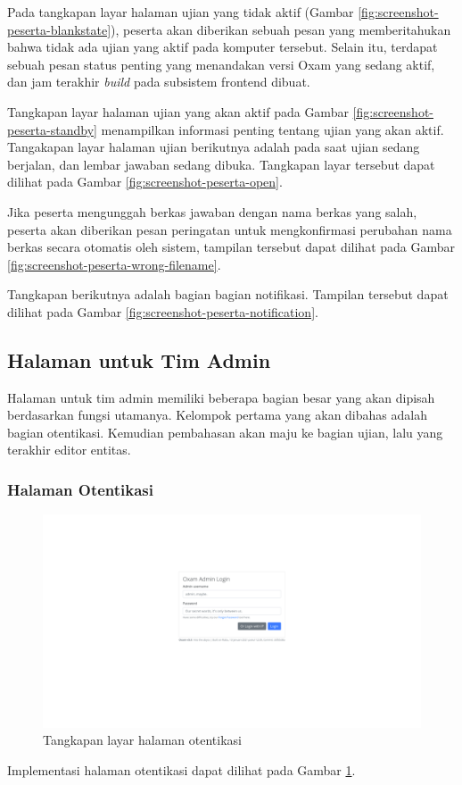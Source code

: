         Pada tangkapan layar halaman ujian yang tidak aktif (Gambar \ref{fig:screenshot-peserta-blankstate}), 
        peserta akan diberikan sebuah pesan
        yang memberitahukan bahwa tidak ada ujian yang aktif pada komputer tersebut. Selain itu, terdapat
        sebuah pesan status penting yang menandakan versi Oxam yang sedang aktif, dan jam terakhir
        \textit{build} pada subsistem frontend dibuat.
        
        Tangkapan layar halaman ujian yang akan aktif pada Gambar \ref{fig:screenshot-peserta-standby} menampilkan
        informasi penting tentang ujian yang akan aktif. Tangakapan layar halaman ujian berikutnya adalah pada saat ujian sedang berjalan, dan lembar jawaban
        sedang dibuka. Tangkapan layar tersebut dapat dilihat pada Gambar \ref{fig:screenshot-peserta-open}.
        
        Jika peserta mengunggah berkas jawaban dengan nama berkas yang salah, peserta akan diberikan pesan peringatan untuk
        mengkonfirmasi perubahan nama berkas secara otomatis oleh sistem, tampilan tersebut dapat dilihat pada
        Gambar \ref{fig:screenshot-peserta-wrong-filename}.
        
        Tangkapan berikutnya adalah bagian bagian notifikasi. Tampilan tersebut dapat dilihat pada Gambar
        \ref{fig:screenshot-peserta-notification}.
        
    \subsection{Halaman untuk Tim Admin}
    Halaman untuk tim admin memiliki beberapa bagian besar yang akan dipisah berdasarkan fungsi utamanya.
    Kelompok pertama yang akan dibahas adalah bagian otentikasi. Kemudian pembahasan akan maju ke bagian
    ujian, lalu yang terakhir editor entitas.
    
    \subsubsection{Halaman Otentikasi}
    \begin{figure}
        \centering
        \includegraphics[width=0.7\paperwidth]{Gambar/implemented-interface/admin/login.png}
        \caption{Tangkapan layar halaman otentikasi}
        \label{fig:screenshot-admin-authentication}
    \end{figure}
    Implementasi halaman otentikasi dapat dilihat pada Gambar \ref{fig:screenshot-admin-authentication}.
    
